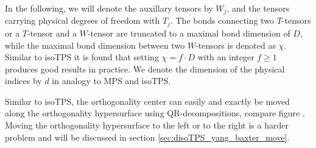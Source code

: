 In the following, we will denote the auxillary tensors by $W_j$, and the tensors carrying physical degrees of freedom with $T_j$. The bonds connecting two $T$-tensors or a $T$-tensor and a $W$-tensor are truncated to a maximal bond dimension of $D$, while the maximal bond dimension between two $W$-tensors is denoted as $\chi$. Similar to isoTPS it is found that setting $\chi=f\cdot D$ with an integer $f\ge1$ produces good results in practice. We denote the dimension of the physical indices by $d$ in analogy to MPS and isoTPS. \par
Similar to isoTPS, the orthogonality center can easily and exactly be moved along the orthogonality hypersurface using QR-decompositions, compare figure . Moving the orthogonality hypersurface to the left or to the right is a harder problem and will be discussed in section \ref{sec:disoTPS_yang_baxter_move}. \par

